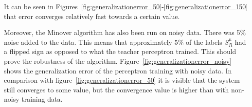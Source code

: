 It can be seen in Figures~\ref{fig:generalizationerror_50}-\ref{fig:generalizationerror_150} that error converges relatively fast towards a certain value.

Moreover, the Minover algorithm has also been run on noisy data.
There was 5\% noise added to the data.
This means that approximately 5\% of the labels $S^{\mu}_R$ had a flipped sign as opposed to what the teacher perceptron trained.
This should prove the robustness of the algorithm.
Figure~\ref{fig:generalizationerror_noisy} shows the generalization error of the perceptron training with noisy data.
In comparison with figure~\ref{fig:generalizationerror_50} it is visible that the system still converges to some value, but the convergence value is higher than with non-noisy training data. 

